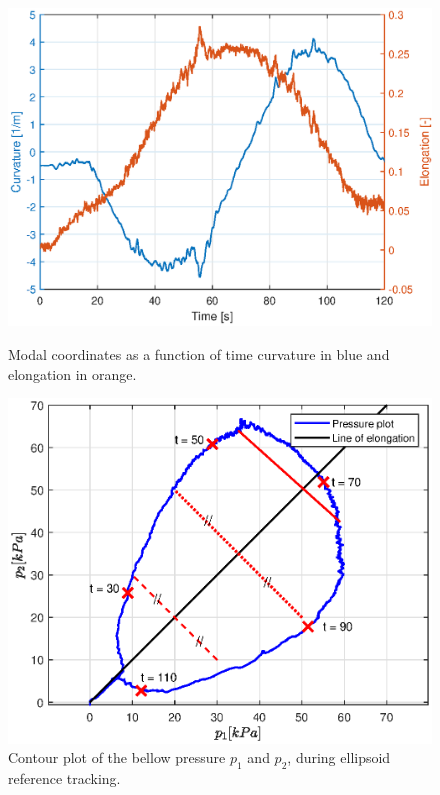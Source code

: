 \begin{figure}[H] 
    \begin{minipage}[b]{0.49\linewidth}
    \centering
    \includegraphics[width = \textwidth]{Figures/Chapter5/modalcoordsellips.eps}
    \caption{Modal coordinates as a function of time curvature in blue and elongation in orange.}
    \label{fig5:ellipstheta}
       \end{minipage} 
    \begin{minipage}[b]{0.49\linewidth}
    \centering
    \includegraphics[width = \textwidth]{Figures/Chapter5/pressurecontour.eps}
    \caption{Contour plot of the bellow pressure $p_1$ and $p_2$, during ellipsoid reference tracking.}
    \label{fig5:pressureellips}
    \end{minipage} 
\end{figure}

